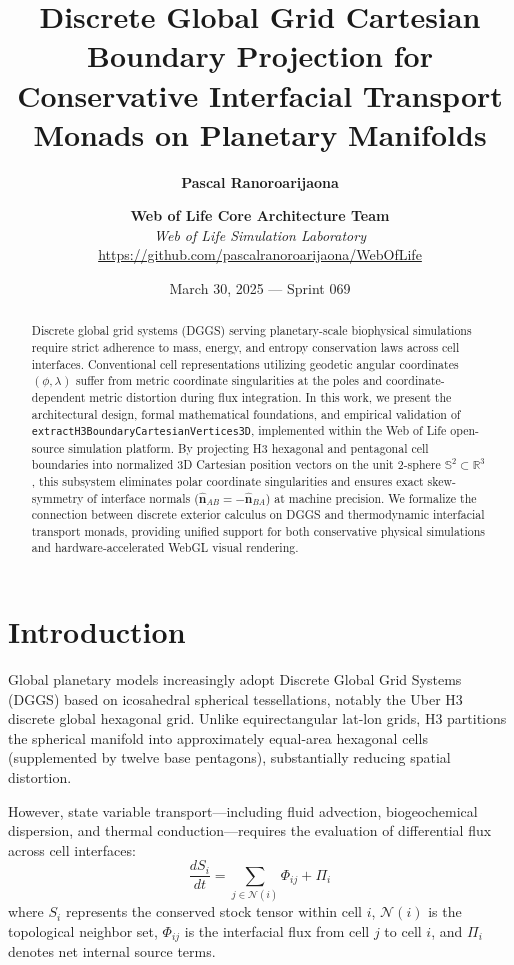 \documentclass[10pt,twocolumn]{article}
\title{\textbf{Discrete Global Grid Cartesian Boundary Projection for Conservative Interfacial Transport Monads on Planetary Manifolds}}
\author{
  \textbf{Pascal Ranoroarijaona} \and \textbf{Web of Life Core Architecture Team} \\
  \textit{Web of Life Simulation Laboratory} \\
  \url{https://github.com/pascalranoroarijaona/WebOfLife}
}
\date{March 30, 2025 --- Sprint 069}
\theoremstyle{definition}
\begin{document}
\maketitle

\begin{abstract}
Discrete global grid systems (DGGS) serving planetary-scale biophysical simulations require strict adherence to mass, energy, and entropy conservation laws across cell interfaces. Conventional cell representations utilizing geodetic angular coordinates $(\phi, \lambda)$ suffer from metric coordinate singularities at the poles and coordinate-dependent metric distortion during flux integration. In this work, we present the architectural design, formal mathematical foundations, and empirical validation of \texttt{extractH3BoundaryCartesianVertices3D}, implemented within the Web of Life open-source simulation platform. By projecting H3 hexagonal and pentagonal cell boundaries into normalized 3D Cartesian position vectors on the unit 2-sphere $\mathbb{S}^2 \subset \mathbb{R}^3$, this subsystem eliminates polar coordinate singularities and ensures exact skew-symmetry of interface normals ($\hat{\mathbf{n}}_{AB} = -\hat{\mathbf{n}}_{BA}$) at machine precision. We formalize the connection between discrete exterior calculus on DGGS and thermodynamic interfacial transport monads, providing unified support for both conservative physical simulations and hardware-accelerated WebGL visual rendering.
\end{abstract}

\section{Introduction}
Global planetary models increasingly adopt Discrete Global Grid Systems (DGGS) based on icosahedral spherical tessellations, notably the Uber H3 discrete global hexagonal grid. Unlike equirectangular lat-lon grids, H3 partitions the spherical manifold into approximately equal-area hexagonal cells (supplemented by twelve base pentagons), substantially reducing spatial distortion.

However, state variable transport—including fluid advection, biogeochemical dispersion, and thermal conduction—requires the evaluation of differential flux across cell interfaces:
\begin{equation}
\frac{d S_i}{dt} = \sum_{j \in \mathcal{N}(i)} \Phi_{ij} + \Pi_i
\end{equation}
where $S_i$ represents the conserved stock tensor within cell $i$, $\mathcal{N}(i)$ is the topological neighbor set, $\Phi_{ij}$ is the interfacial flux from cell $j$ to cell $i$, and $\Pi_i$ denotes net internal source terms.
\end{document}
